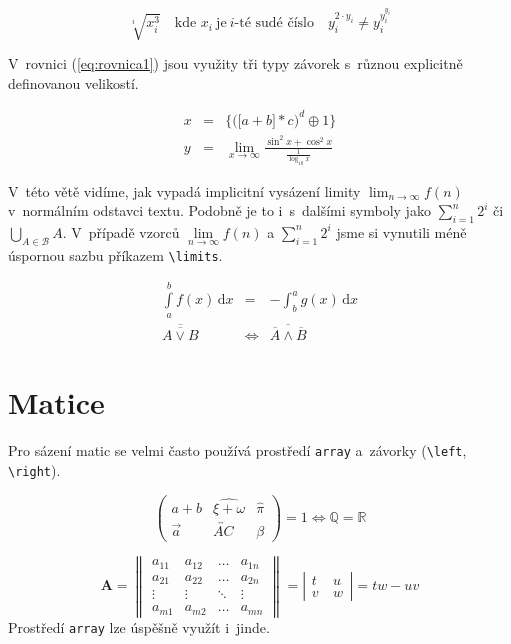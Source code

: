\documentclass[twocolumn,a4paper,11pt]{article}
\theoremstyle{definition}
\begin{document}
$$\sqrt[i]{x^3_i}\quad \text{kde } x_i\ \text{je}\ i\text{-té sudé číslo}\quad y_i^{2\cdot y_i} \neq y_i^{y_i^{y_i}}$$

V~rovnici (\ref{eq:rovnica1}) jsou využity tři typy závorek s~různou
explicitně definovanou velikostí.

\begin{eqnarray}
\label{eq:rovnica1}
x & = &\bigg\{\Big(\big[a + b\big] * c\Big)^d \oplus 1 \bigg\}
\\
y & = &\lim_{x \to \infty} \frac{\sin^2x + \cos^2x}{\frac{1}{\log_{10}x}}
\nonumber
\end{eqnarray}

V~této větě vidíme, jak vypadá implicitní vysázení limity $\lim_{n \to \infty} f(n)$ v~normálním odstavci textu. Podobně
je to i~s~dalšími symboly jako $\sum^n_{i=1}2^i$ či $\bigcup_{A \in \mathcal{B}}A$. V~případě vzorců $\lim\limits_{n \to \infty} f(n)$ a $\sum\limits_{i=1}^n 2^i$ jsme si vynutili méně úspornou
sazbu příkazem \verb|\limits|.

\begin{eqnarray}
\int\limits_a^b f(x)\,\mathrm{d}x & = & -\int_b^a g(x)\,\mathrm{d}x 
\\
\overline{\overline{A \vee B}} & \Leftrightarrow & \overline{\overline{A} \wedge \overline{B}}
\end{eqnarray}

\section{Matice}
Pro sázení matic se velmi často používá prostředí \texttt{array}
a~závorky (\verb|\left|, \verb|\right|).

$$\left(
\begin{array}{ccc}
a + b & \widehat{\xi + \omega} & \hat{\pi} \\
\vec{a} & \overleftrightarrow{AC} & \beta
\end{array}
\right) = 1 \Longleftrightarrow \mathbb{Q} = \mathbb{R}$$
 
$$\mathbf{A} = \left\|
\begin{array}{cccc}
a_{11} & a_{12} & \ldots & a_{1n} \\
a_{21} & a_{22} & \ldots & a_{2n} \\
\vdots & \vdots & \ddots & \vdots \\
a_{m1} & a_{m2} & \ldots & a_{mn}
\end{array}
\right\| = \left|
\begin{array}{cc}
t & u~\\
v~& w
\end{array}
\right|=tw\!-\!uv$$
\quad Prostředí \texttt{array} lze úspěšně využít i~jinde.
\end{document}
